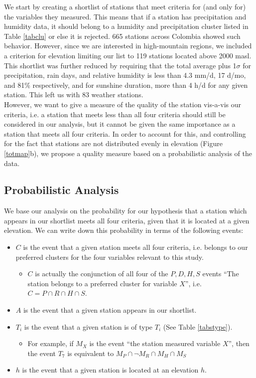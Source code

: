 \documentclass[12pt]{iopart}
\begin{document}
We start by creating a shortlist of stations that meet criteria for (and only for) the variables they measured. This means that if a station has precipitation and humidity data, it should belong to a humidity and precipitation cluster listed in Table \ref{tabclu} or else it is rejected. 665 stations across Colombia showed such behavior. However, since we are interested in high-mountain regions, we included a criterion for elevation limiting our list to 119 stations located above 2000 masl. This shortlist was further reduced by requiring that the total average plus 1$\sigma$ for precipitation, rain days, and relative humidity is less than 4.3 mm/d, 17 d/mo, and 81\% respectively, and for sunshine duration, more than 4 h/d for any given station. This left us with 83 weather stations. \\

However, we want to give a measure of the quality of the station vis-a-vis our criteria, i.e. a station that meets less than all four criteria should still be considered in our analysis, but it cannot be given the same importance as a station that meets all four criteria. In order to account for this, and controlling for the fact that stations are not distributed evenly in elevation (Figure \ref{totmap}b), we propose a quality measure based on a probabilistic analysis of the data.


\subsection{Probabilistic Analysis}

We base our analysis on the probability for our hypothesis that a station which appears in our shortlist meets all four criteria, given that it is located at a given elevation. We can write down this probability in terms of the following events:

\begin{itemize}
\item $C$ is the event that a given station meets all four criteria, i.e. belongs to our preferred clusters for the four variables relevant to this study.
\begin{itemize}
\item $C$ is actually the conjunction of all four of the $P,D,H,S$ events ``The station belongs to a preferred cluster for variable $X$'', i.e. $C=P\cap R\cap H \cap S$.
\end{itemize}
\item $A$ is the event that a given station appears in our shortlist.
\item $T_i$ is the event that a given station is of type $T_i$ (See Table \ref{tabstype}).
\begin{itemize}
\item For example, if $M_X$ is the event ``the station measured variable $X$'', then the event $T_7$ is equivalent to $M_P\cap \neg M_R\cap M_H \cap M_S$
\end{itemize}
\item $h$ is the event that a given station is located at an elevation $h$.
\end{itemize}
\end{document}
